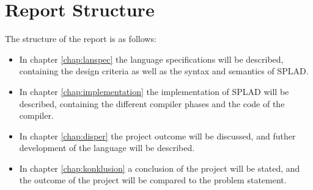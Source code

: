 \section{Report Structure}
The structure of the report is as follows:
\begin{itemize}
	\item In chapter \ref{chap:lanspec} the language specifications will be described, containing the design criteria as well as the syntax and semantics of SPLAD.
	\item In chapter \ref{chap:implementation} the implementation of SPLAD will be described, containing the different compiler phases and the code of the compiler.
	\item In chapter \ref{chap:disper} the project outcome will be discussed, and futher development of the language will be described.
	\item In chapter \ref{chap:konklusion} a conclusion of the project will be stated, and the outcome of the project will be compared to the problem statement.
\end{itemize}